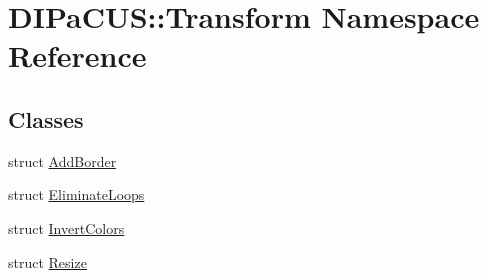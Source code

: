 \hypertarget{namespaceDIPaCUS_1_1Transform}{}\section{D\+I\+Pa\+C\+US\+:\+:Transform Namespace Reference}
\label{namespaceDIPaCUS_1_1Transform}
\subsection*{Classes}
\begin{DoxyCompactItemize}
\item 
struct \mbox{\hyperlink{structDIPaCUS_1_1Transform_1_1AddBorder}{Add\+Border}}
\item 
struct \mbox{\hyperlink{structDIPaCUS_1_1Transform_1_1EliminateLoops}{Eliminate\+Loops}}
\item 
struct \mbox{\hyperlink{structDIPaCUS_1_1Transform_1_1InvertColors}{Invert\+Colors}}
\item 
struct \mbox{\hyperlink{structDIPaCUS_1_1Transform_1_1Resize}{Resize}}
\end{DoxyCompactItemize}
